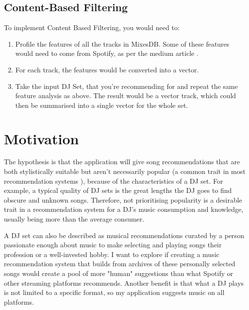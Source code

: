 \documentclass[11pt,titlepage,oneside]{book}
\begin{document}
  \subsection{Content-Based Filtering}
  To implement Content Based Filtering, you would need to:
 \begin{enumerate}
 	
 	\item  Profile the features of all the tracks in MixesDB. Some of these features would need to come from Spotify, as per the medium article \citep{chow_music_2020}.
 	
 	\item For each track, the features would be converted into a vector.
 	
 	\item Take the input DJ Set, that you're recommending for and repeat the same feature analysis as above. The result would be a vector track, which could then be summarised into a single vector for the whole set.
 	
 \end{enumerate}

\section{Motivation}

	The hypothesis is that the application will give song recommendations that are both stylistically suitable but aren't necessarily popular (a common trait in most recommendation systems \citep{lesota_analyzing_2021}), because of the characteristics of a DJ set. For example, a typical quality of DJ sets is the great lengths the DJ goes to find obscure and unknown songs. Therefore, not prioritising popularity is a desirable trait in a recommendation system for a DJ's music consumption and knowledge, usually being more than the average consumer. 
	
	\begin{flushleft}
		
		A DJ set can also be described as musical recommendations curated by a person passionate enough about music to make selecting and playing songs their profession or a well-invested hobby. I want to explore if creating a music recommendation system that builds from archives of these personally selected songs would create a pool of more "human" suggestions than what Spotify or other streaming platforms recommends. Another benefit is that what a DJ plays is not limited to a specific format, so my application suggests music on all platforms.
		
	\end{flushleft}
	
\end{document}
